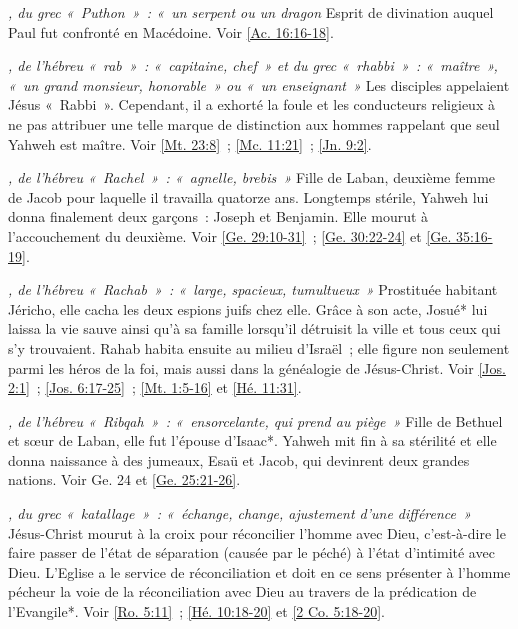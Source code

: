 \begin{multicols}{2}
\textit{, du grec «~Puthon~»~: «~un serpent ou un dragon}\newline
Esprit de divination auquel Paul fut confronté en Macédoine. Voir \vref{Ac. 16:16-18}.

\textit{, de l'hébreu «~rab~»~: «~capitaine, chef~» et du grec «~rhabbi~»~: «~maître~», «~un grand monsieur, honorable~» ou «~un enseignant~»}\newline
Les disciples appelaient Jésus «~Rabbi~». Cependant, il a exhorté la foule et les conducteurs religieux à ne pas attribuer une telle marque de distinction aux hommes rappelant que seul Yahweh est maître. Voir \vref{Mt. 23:8}~; \vref{Mc. 11:21}~; \vref{Jn. 9:2}.

\textit{, de l'hébreu «~Rachel~»~: «~agnelle, brebis~»}\newline
Fille de Laban, deuxième femme de Jacob pour laquelle il travailla quatorze ans. Longtemps stérile, Yahweh lui donna finalement deux garçons~: Joseph et Benjamin. Elle mourut à l'accouchement du deuxième. Voir \vref{Ge. 29:10-31}~; \vref{Ge. 30:22-24} et \vref{Ge. 35:16-19}.

\textit{, de l'hébreu «~Rachab~»~: «~large, spacieux, tumultueux~»}\newline
Prostituée habitant Jéricho, elle cacha les deux espions juifs chez elle. Grâce à son acte, Josué* lui laissa la vie sauve ainsi qu'à sa famille lorsqu'il détruisit la ville et tous ceux qui s'y trouvaient. Rahab habita ensuite au milieu d'Israël~; elle figure non seulement parmi les héros de la foi, mais aussi dans la généalogie de Jésus-Christ. Voir \vref{Jos. 2:1}~; \vref{Jos. 6:17-25}~; \vref{Mt. 1:5-16} et \vref{Hé. 11:31}.

\textit{, de l'hébreu «~Ribqah~»~: «~ensorcelante, qui prend au piège~»}\newline
Fille de Bethuel et sœur de Laban, elle fut l'épouse d'Isaac*. Yahweh mit fin à sa stérilité et elle donna naissance à des jumeaux, Esaü et Jacob, qui devinrent deux grandes nations. Voir Ge. 24 et \vref{Ge. 25:21-26}.

\textit{, du grec «~katallage~»~: «~échange, change, ajustement d'une différence~»}\newline
Jésus-Christ mourut à la croix pour réconcilier l'homme avec Dieu, c'est-à-dire le faire passer de l'état de séparation (causée par le péché) à l'état d'intimité avec Dieu. L'Eglise a le service de réconciliation et doit en ce sens présenter à l'homme pécheur la voie de la réconciliation avec Dieu au travers de la prédication de l'Evangile*. Voir \vref{Ro. 5:11}~; \vref{Hé. 10:18-20} et \vref{2 Co. 5:18-20}.


\end{multicols}
